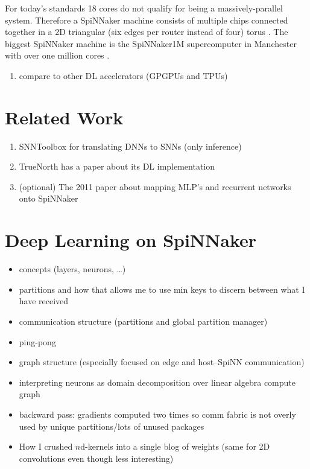 \documentclass[]{article}
\begin{document}
For today's standards 18 cores do not qualify for being a
massively-parallel system.
Therefore a SpiNNaker machine consists of multiple chips connected
together in a 2D triangular (six edges per router instead of four)
torus \citep{furber_et_al_2020}.
The biggest SpiNNaker machine is the SpiNNaker1M supercomputer in
Manchester with over one million cores \citep{furber_et_al_2020}.

\begin{enumerate}
  \item compare to other DL accelerators (GPGPUs and TPUs)
\end{enumerate}






\section{Related Work} %
\label{sec:related_work}

\begin{enumerate}
  \item SNNToolbox for translating DNNs to SNNs (only inference)
  \item TrueNorth has a paper about its DL implementation
  \item (optional) The 2011 paper about mapping MLP's and recurrent
    networks onto SpiNNaker
\end{enumerate}



\section{Deep Learning on SpiNNaker}
\label{sec:SpiDNN}

\begin{itemize}
  \item concepts (layers, neurons, \dots)
  \item partitions and how that allows me to use min keys to discern
    between what I have received
  \item communication structure (partitions and global partition manager)
  \item ping-pong
  \item graph structure (especially focused on edge and host--SpiNN
    communication)
  \item interpreting neurons as domain decomposition over linear algebra
    compute graph
  \item backward pass: gradients computed two times so comm fabric is
    not overly used by unique partitions/lots of unused packages
  \item How I crushed $n$d-kernels into a single blog of weights (same
    for 2D convolutions even though less interesting)
\end{itemize}
\end{document}

